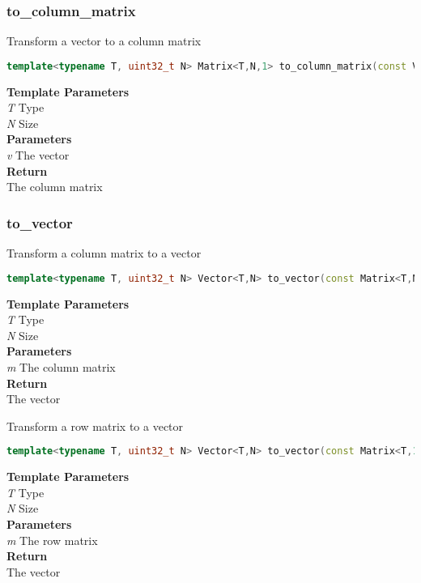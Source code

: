 \subsubsection{to\_column\_matrix}
\begin{mdframed}
Transform a vector to a column matrix
\begin{lstlisting}[language=C++]
template<typename T, uint32_t N> Matrix<T,N,1> to_column_matrix(const Vector<T,N>& v) 
\end{lstlisting}
\textbf{Template Parameters} \\ 
\textit{T} Type \\ 
\textit{N} Size \\ 
\textbf{Parameters} \\ 
\textit{v} The vector \\ 
\textbf{Return} \\ 
The column matrix\\ 
\end{mdframed}

\subsubsection{to\_vector}
\begin{mdframed}
Transform a column matrix to a vector
\begin{lstlisting}[language=C++]
template<typename T, uint32_t N> Vector<T,N> to_vector(const Matrix<T,N,1>& m) 
\end{lstlisting}
\textbf{Template Parameters} \\ 
\textit{T} Type \\ 
\textit{N} Size \\ 
\textbf{Parameters} \\ 
\textit{m} The column matrix \\ 
\textbf{Return} \\ 
The vector\\ 
\end{mdframed}

\begin{mdframed}
Transform a row matrix to a vector
\begin{lstlisting}[language=C++]
template<typename T, uint32_t N> Vector<T,N> to_vector(const Matrix<T,1,N>& m) 
\end{lstlisting}
\textbf{Template Parameters} \\ 
\textit{T} Type \\ 
\textit{N} Size \\ 
\textbf{Parameters} \\ 
\textit{m} The row matrix \\ 
\textbf{Return} \\ 
The vector\\ 
\end{mdframed}

